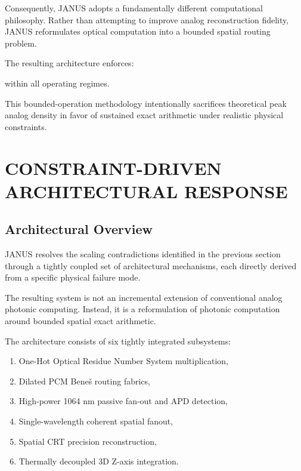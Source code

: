 \documentclass[journal]{IEEEtran}
\begin{document}
Consequently, JANUS adopts a fundamentally different computational philosophy. Rather than attempting to improve analog reconstruction fidelity, JANUS reformulates optical computation into a bounded spatial routing problem.

The resulting architecture enforces:

\begin{center}
\end{center}

\begin{center}
\end{center}

\begin{center}
\end{center}

within all operating regimes.

This bounded-operation methodology intentionally sacrifices theoretical peak analog density in favor of sustained exact arithmetic under realistic physical constraints.

\section{CONSTRAINT-DRIVEN ARCHITECTURAL RESPONSE}


\subsection{\textbf{Architectural Overview}}

JANUS resolves the scaling contradictions identified in the previous section through a tightly coupled set of architectural mechanisms, each directly derived from a specific physical failure mode.

The resulting system is not an incremental extension of conventional analog photonic computing. Instead, it is a reformulation of photonic computation around bounded spatial exact arithmetic.

The architecture consists of six tightly integrated subsystems:

\begin{enumerate}
\item One-Hot Optical Residue Number System multiplication,
\item Dilated PCM Beneš routing fabrics,
\item High-power 1064 nm passive fan-out and APD detection,
\item Single-wavelength coherent spatial fanout,
\item Spatial CRT precision reconstruction,
\item Thermally decoupled 3D Z-axis integration.
\end{enumerate}
\end{document}
